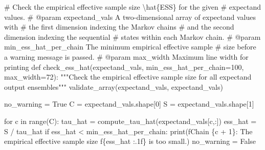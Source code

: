 \documentclass[
  letterpaper,
  DIV=11,
  numbers=noendperiod]{scrartcl}
\newenvironment{Shaded}{\begin{snugshade}}{\end{snugshade}}
\newcommand{\BuiltInTok}[1]{\textcolor[rgb]{0.00,0.23,0.31}{#1}}
\newcommand{\CommentTok}[1]{\textcolor[rgb]{0.37,0.37,0.37}{#1}}
\newcommand{\ControlFlowTok}[1]{\textcolor[rgb]{0.00,0.23,0.31}{#1}}
\newcommand{\DecValTok}[1]{\textcolor[rgb]{0.68,0.00,0.00}{#1}}
\newcommand{\KeywordTok}[1]{\textcolor[rgb]{0.00,0.23,0.31}{#1}}
\newcommand{\NormalTok}[1]{\textcolor[rgb]{0.00,0.23,0.31}{#1}}
\newcommand{\OperatorTok}[1]{\textcolor[rgb]{0.37,0.37,0.37}{#1}}
\newcommand{\SpecialCharTok}[1]{\textcolor[rgb]{0.37,0.37,0.37}{#1}}
\newcommand{\SpecialStringTok}[1]{\textcolor[rgb]{0.13,0.47,0.30}{#1}}
\newcommand{\StringTok}[1]{\textcolor[rgb]{0.13,0.47,0.30}{#1}}
\newcommand{\VariableTok}[1]{\textcolor[rgb]{0.07,0.07,0.07}{#1}}
\begin{document}
\begin{Shaded}
\begin{Highlighting}[]
\CommentTok{\# Check the empirical effective sample size \textbackslash{}hat\{ESS\} for the given}
\CommentTok{\# expectand values.}
\CommentTok{\# @param expectand\_vals A two{-}dimensional array of expectand values with}
\CommentTok{\#                       the first dimension indexing the Markov chains}
\CommentTok{\#                       and the second dimension indexing the sequential}
\CommentTok{\#                       states within each Markov chain.}
\CommentTok{\# @param min\_ess\_hat\_per\_chain The minimum empirical effective sample}
\CommentTok{\#                              size before a warning message is passed.}
\CommentTok{\# @param max\_width Maximum line width for printing}
\KeywordTok{def}\NormalTok{ check\_ess\_hat(expectand\_vals,}
\NormalTok{                  min\_ess\_hat\_per\_chain}\OperatorTok{=}\DecValTok{100}\NormalTok{,}
\NormalTok{                  max\_width}\OperatorTok{=}\DecValTok{72}\NormalTok{):}
  \CommentTok{"""Check the empirical effective sample size for all expectand}
\CommentTok{     output ensembles"""}
\NormalTok{  validate\_array(expectand\_vals, }\StringTok{\textquotesingle{}expectand\_vals\textquotesingle{}}\NormalTok{)}

\NormalTok{  no\_warning }\OperatorTok{=} \VariableTok{True}
\NormalTok{  C }\OperatorTok{=}\NormalTok{ expectand\_vals.shape[}\DecValTok{0}\NormalTok{]}
\NormalTok{  S }\OperatorTok{=}\NormalTok{ expectand\_vals.shape[}\DecValTok{1}\NormalTok{]}

  \ControlFlowTok{for}\NormalTok{ c }\KeywordTok{in} \BuiltInTok{range}\NormalTok{(C):}
\NormalTok{    tau\_hat }\OperatorTok{=}\NormalTok{ compute\_tau\_hat(expectand\_vals[c,:])}
\NormalTok{    ess\_hat }\OperatorTok{=}\NormalTok{ S }\OperatorTok{/}\NormalTok{ tau\_hat}
    \ControlFlowTok{if}\NormalTok{ ess\_hat }\OperatorTok{\textless{}}\NormalTok{ min\_ess\_hat\_per\_chain:}
      \BuiltInTok{print}\NormalTok{(}\SpecialStringTok{f\textquotesingle{}Chain }\SpecialCharTok{\{}\NormalTok{c }\OperatorTok{+} \DecValTok{1}\SpecialCharTok{\}}\SpecialStringTok{: The empirical effective sample size \textquotesingle{}}
            \SpecialStringTok{f\textquotesingle{}}\SpecialCharTok{\{}\NormalTok{ess\_hat }\SpecialCharTok{:.1f\}}\SpecialStringTok{ is too small.\textquotesingle{}}\NormalTok{)}
\NormalTok{      no\_warning }\OperatorTok{=} \VariableTok{False}


\end{Highlighting}
\end{Shaded}
\end{document}
